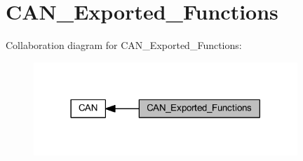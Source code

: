 \hypertarget{group___c_a_n___exported___functions}{}\section{C\+A\+N\+\_\+\+Exported\+\_\+\+Functions}
\label{group___c_a_n___exported___functions}
Collaboration diagram for C\+A\+N\+\_\+\+Exported\+\_\+\+Functions\+:
\nopagebreak
\begin{figure}[H]
\begin{center}
\leavevmode
\includegraphics[width=282pt]{group___c_a_n___exported___functions}
\end{center}
\end{figure}
